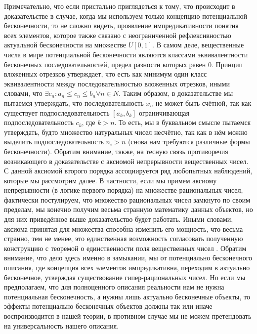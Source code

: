\documentclass[12pt]{article}
\begin{document}
Примечательно, что если пристально приглядеться к тому, что происходит в доказательстве в случае, когда мы используем только концепцию потенциальной бесконечности, то не сложно видеть, проявление импредикативности понятия всех элементов, которое также связано с неограниченной рефлексивностью актуальной бесконечности на множестве $U[0, 1]$. В самом деле, вещественные числа в мире потенциальной бесконечности являются классами эквивалентности бесконечных последовательностей, предел разности которых равен 0. Принцип вложенных отрезков утверждает, что есть как минимум один класс эквивалентности между последовательностью вложенных отрезков, иными словами, что $\exists c_n: a_n \leq c_n \leq b_n \forall n \in N$. Таким образом, в доказательстве мы пытаемся утверждать, что последовательность $x_n$ не может быть счётной, так как существует подпоследовательность $[a_k, b_k]$ ограничивающая подпоследовательность $c_k$, где $k > n$. То есть, мы в буквальном смысле пытаемся утверждать, будто множество натуральных чисел несчётно, так как в нём можно выделить подпоследовательность $n_i > n$ (снова нам требуются различные формы бесконечности). Обратим внимание, также, на тесную связь противоречия возникающего в доказательстве с аксиомой непрерывности вещественных чисел. С данной аксиомой второго порядка ассоциируется ряд любопытных наблюдений, которые мы рассмотрим далее. В частности, если мы примем аксиому непрерывности (в логике первого порядка) на множестве рациональных чисел, фактически постулируем, что множество рациональных чисел замкнуто по своим пределам, мы конечно получим весьма странную математику данных объектов, но для них приведённое выше доказательство будет работать. Иными словами, аксиома принятая для множества способна изменить его мощность, что весьма странно, тем не менее, это единственная возможность согласовать полученную конструкцию с теоремой о единственности поля вещественных чисел \cite{matan-rational-uniqueness}. Обратим внимание, что дело здесь именно в замыкании, мы от потенциально бесконечного описания, где концепция всех элементов импредикативна, переходим в актуально бесконечное, утверждая существование гипер-рациональных чисел. Но если мы предполагаем, что для полноценного описания реальности нам не нужна потенциальная бесконечность, а нужны лишь актуально бесконечные объекты, то эффекты потенциально бесконечных объектов должны так или иначе воспроизводится в нашей теории, в противном случае мы не можем претендовать на универсальность нашего описания.
\end{document}
